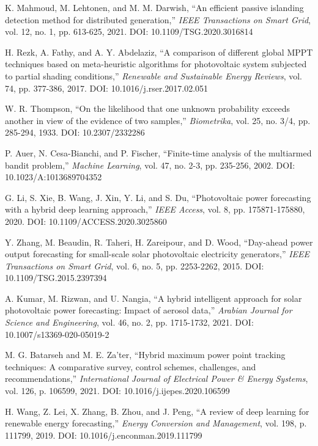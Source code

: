 \documentclass[12pt,a4paper]{article}
\begin{document}

\begin{thebibliography}{16}

K. Mahmoud, M. Lehtonen, and M. M. Darwish, ``An efficient passive islanding detection method for distributed generation,'' \emph{IEEE Transactions on Smart Grid}, vol. 12, no. 1, pp. 613-625, 2021. DOI: 10.1109/TSG.2020.3016814

H. Rezk, A. Fathy, and A. Y. Abdelaziz, ``A comparison of different global MPPT techniques based on meta-heuristic algorithms for photovoltaic system subjected to partial shading conditions,'' \emph{Renewable and Sustainable Energy Reviews}, vol. 74, pp. 377-386, 2017. DOI: 10.1016/j.rser.2017.02.051

W. R. Thompson, ``On the likelihood that one unknown probability exceeds another in view of the evidence of two samples,'' \emph{Biometrika}, vol. 25, no. 3/4, pp. 285-294, 1933. DOI: 10.2307/2332286

P. Auer, N. Cesa-Bianchi, and P. Fischer, ``Finite-time analysis of the multiarmed bandit problem,'' \emph{Machine Learning}, vol. 47, no. 2-3, pp. 235-256, 2002. DOI: 10.1023/A:1013689704352

G. Li, S. Xie, B. Wang, J. Xin, Y. Li, and S. Du, ``Photovoltaic power forecasting with a hybrid deep learning approach,'' \emph{IEEE Access}, vol. 8, pp. 175871-175880, 2020. DOI: 10.1109/ACCESS.2020.3025860

Y. Zhang, M. Beaudin, R. Taheri, H. Zareipour, and D. Wood, ``Day-ahead power output forecasting for small-scale solar photovoltaic electricity generators,'' \emph{IEEE Transactions on Smart Grid}, vol. 6, no. 5, pp. 2253-2262, 2015. DOI: 10.1109/TSG.2015.2397394

A. Kumar, M. Rizwan, and U. Nangia, ``A hybrid intelligent approach for solar photovoltaic power forecasting: Impact of aerosol data,'' \emph{Arabian Journal for Science and Engineering}, vol. 46, no. 2, pp. 1715-1732, 2021. DOI: 10.1007/s13369-020-05019-2

M. G. Batarseh and M. E. Za'ter, ``Hybrid maximum power point tracking techniques: A comparative survey, control schemes, challenges, and recommendations,'' \emph{International Journal of Electrical Power \& Energy Systems}, vol. 126, p. 106599, 2021. DOI: 10.1016/j.ijepes.2020.106599

H. Wang, Z. Lei, X. Zhang, B. Zhou, and J. Peng, ``A review of deep learning for renewable energy forecasting,'' \emph{Energy Conversion and Management}, vol. 198, p. 111799, 2019. DOI: 10.1016/j.enconman.2019.111799


\end{thebibliography}
\end{document}
